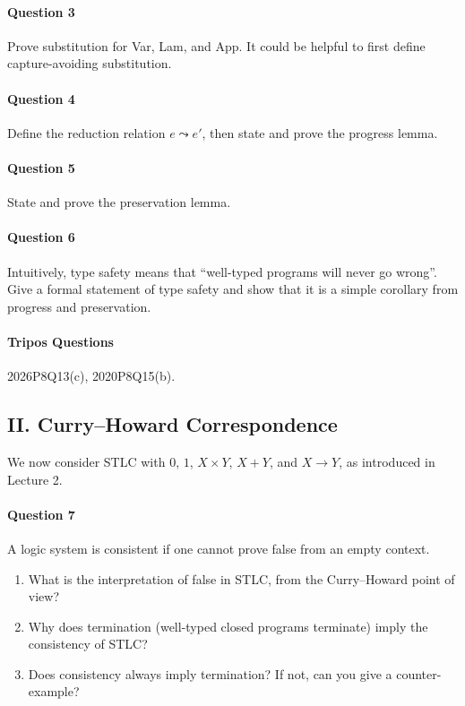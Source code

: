 \documentclass[11pt,a4paper,twoside]{article}
\begin{document}
\paragraph{Question 3} Prove substitution for Var, Lam, and App.
It could be helpful to first define capture-avoiding substitution.

\paragraph{Question 4} Define the reduction relation $e \leadsto e'$,
then state and prove the progress lemma.

\paragraph{Question 5} State and prove the preservation lemma.

\paragraph{Question 6} Intuitively, type safety means that
``well-typed programs will never go wrong''. Give a formal statement
of type safety and show that it is a simple corollary from progress
and preservation.

\paragraph{Tripos Questions} 2026P8Q13(c), 2020P8Q15(b).

\subsection*{II. Curry--Howard Correspondence}

We now consider STLC with $0$, $1$, $X \times Y$, $X + Y$, and $X \to
Y$, as introduced in Lecture 2.

\paragraph{Question 7} A logic system is consistent if one cannot
prove false from an empty context.
\begin{enumerate}[label=(\alph*)]
  \item What is the interpretation of false in STLC, from the
    Curry--Howard point of view?
  \item Why does termination (well-typed closed programs terminate)
    imply the consistency of STLC?
  \item Does consistency always imply termination?
    If not, can you give a counter-example?
\end{enumerate}
\end{document}
